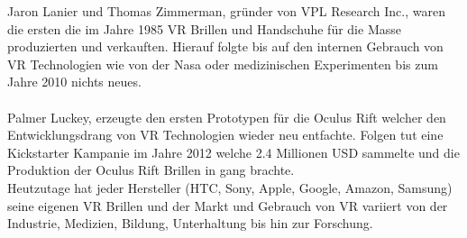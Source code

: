 Jaron Lanier und Thomas Zimmerman, gründer von VPL Research Inc., waren die ersten die im Jahre 1985 VR Brillen und Handschuhe für die Masse
produzierten und verkauften. Hierauf folgte bis auf den internen Gebrauch von VR Technologien wie von der Nasa oder medizinischen
Experimenten bis zum Jahre 2010 nichts neues.\cite{virtualrealityhistory}\\ \\
Palmer Luckey, erzeugte den ersten Prototypen für die Oculus Rift welcher den Entwicklungsdrang von VR Technologien wieder neu entfachte.  
Folgen tut eine Kickstarter Kampanie im Jahre 2012 welche 2.4 Millionen USD sammelte und die Produktion der Oculus Rift Brillen
in gang brachte.\cite{virtualrealityhistory}\\
Heutzutage hat jeder Hersteller (HTC, Sony, Apple, Google, Amazon, Samsung) seine eigenen VR Brillen und der Markt und Gebrauch von VR
variiert von der Industrie, Medizien, Bildung, Unterhaltung bis hin zur Forschung.

